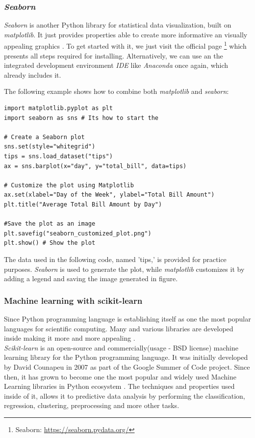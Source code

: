 \documentclass[12pt,a4paper, oneside]{book}
\begin{document}
\subsubsection*{\textit{Seaborn}}
\textit{Seaborn} is another Python library for statistical data visualization, built on \textit{matplotlib}. It just provides properties able to create more informative an visually appealing graphics \citep{sial2021comparative}. To get started with it, we just visit the official page \footnote{Seaborn: \url{https://seaborn.pydata.org/}} which presents all steps required for installing. Alternatively, we can use an  the integrated development environment \textit{IDE} like \textit{Anaconda} once again, which already includes it. 

The following example shows how to combine both \textit{matplotlib} and \textit{seaborn}:  
\begin{lstlisting}[style=stylejupyter]
import matplotlib.pyplot as plt 
import seaborn as sns # Its how to start the 

# Create a Seaborn plot
sns.set(style="whitegrid")
tips = sns.load_dataset("tips")
ax = sns.barplot(x="day", y="total_bill", data=tips)

# Customize the plot using Matplotlib
ax.set(xlabel="Day of the Week", ylabel="Total Bill Amount")
plt.title("Average Total Bill Amount by Day")

#Save the plot as an image
plt.savefig("seaborn_customized_plot.png")
plt.show() # Show the plot
\end{lstlisting} 
The data used in the following code, named 'tips,' is provided for practice purposes. \textit{Seaborn} is used to generate the plot, while \textit{matplotlib} customizes it by adding a legend and saving the image generated in figure.


\subsubsection*{\large Machine learning with scikit-learn} 
Since Python programming language is establishing itself as one the most popular languages for scientific computing. Many and various libraries are developed inside making it more and more appealing \citep{pedregosa2011scikit}. \\

\textit{Scikit-learn} is an open-source and commercially(usage - BSD license) machine learning library for the Python programming language. It was initially developed by David Counapeu in 2007 as part of the Google Summer of Code project. Since then, it has grown to become one the most popular and widely used Machine Learning libraries in Python ecosystem \citep{scikitlearnCode1}.   
The techniques and properties used inside of it, allows it to predictive data analysis by performing the  classification, regression, clustering, preprocessing and more other tasks.\\
\end{document}

